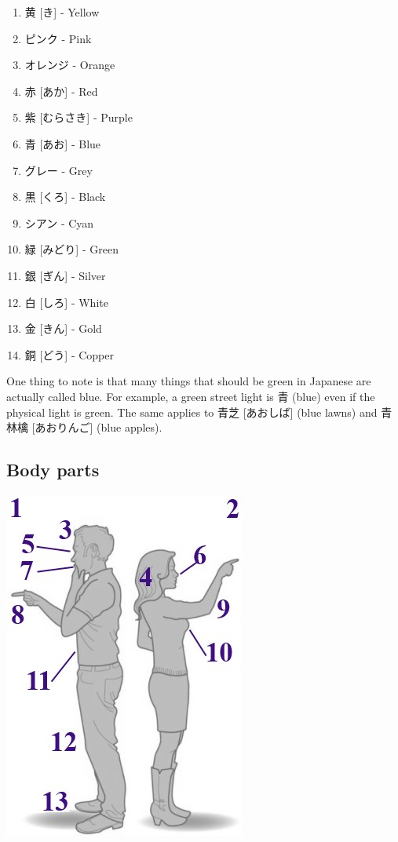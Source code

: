 \documentclass{article}
\begin{document}
\begin{CJK}{UTF8}{min}
\begin{multicols*}{3}
\begin{enumerate}
\item 黄 [き] - Yellow
\item ピンク - Pink
\item オレンジ - Orange
\item 赤 [あか] - Red
\item 紫 [むらさき] - Purple
\item 青 [あお] - Blue
\item グレー - Grey
\item 黒 [くろ] - Black
\item シアン - Cyan
\item 緑 [みどり] - Green
\item 銀 [ぎん] - Silver
\item 白 [しろ] - White
\item 金 [きん] - Gold
\item 銅 [どう] - Copper
\end{enumerate}

One thing to note is that many things that should be green in Japanese are actually called blue. For example, a green street light is 青 (blue) even if the physical light is 
green. The same applies to 青芝 [あおしば] (blue lawns) and 青林檎 [あおりんご] (blue apples).

\subsection{Body parts}

\includegraphics{bodies}


\end{multicols*}
\end{CJK}
\end{document}
